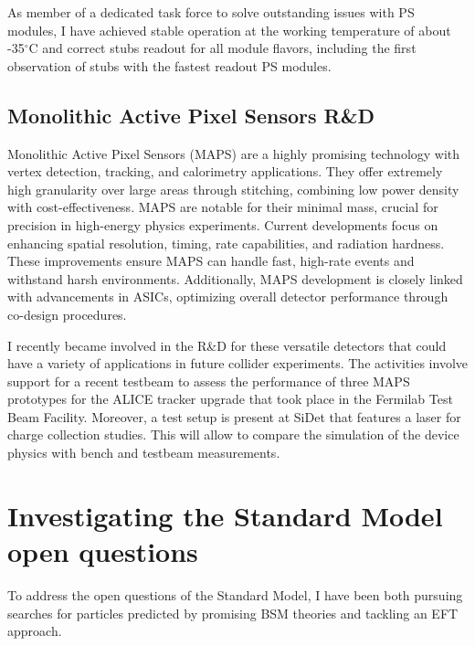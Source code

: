 {\begin{flushleft}
As member of a dedicated task force to solve outstanding issues with PS modules, I have achieved stable operation at the working temperature of about -35$^{\circ}$C and correct stubs readout for all module flavors, including the first observation of stubs with the fastest readout PS modules.  

\vspace{\baselineskip} 
\subsection{Monolithic Active Pixel Sensors R\&D}
\vspace{\baselineskip}
Monolithic Active Pixel Sensors (MAPS) are a highly promising technology with vertex detection, tracking, and calorimetry applications. They offer extremely high granularity over large areas through stitching, combining low power density with cost-effectiveness. MAPS are notable for their minimal mass, crucial for precision in high-energy physics experiments.
Current developments focus on enhancing spatial resolution, timing, rate capabilities, and radiation hardness. These improvements ensure MAPS can handle fast, high-rate events and withstand harsh environments. Additionally, MAPS development is closely linked with advancements in ASICs, optimizing overall detector performance through co-design procedures.

I recently became involved in the R\&D for these versatile detectors that could have a variety of applications in future collider experiments. The activities involve support for a recent testbeam to assess the performance of three MAPS prototypes for the ALICE tracker upgrade that took place in the Fermilab Test Beam Facility. Moreover, a test setup is present at SiDet that features a laser for charge collection studies. This will allow to compare the simulation of the device physics with bench and testbeam measurements.


\vspace{\baselineskip}
\section{Investigating the Standard Model open questions}
\vspace{\baselineskip}
To address the open questions of the Standard Model, I have been both pursuing searches for particles predicted by promising BSM theories and tackling an EFT approach.


\end{flushleft}}
